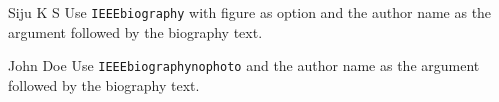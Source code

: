 \documentclass[
  journal,
]{IEEEtran}%
\providecommand{\bibfont}{\footnotesize}
\begin{document}
\ifCLASSOPTIONcaptionsoff
  \newpage
\fi



\pagebreak[3]
\begin{IEEEbiography}{Siju K S}
Use \texttt{IEEEbiography} with figure as option and the author name as
the argument followed by the biography text.
\end{IEEEbiography}
\begin{IEEEbiographynophoto}{John Doe}
Use \texttt{IEEEbiographynophoto} and the author name as the argument
followed by the biography text.
\end{IEEEbiographynophoto}
\end{document}
